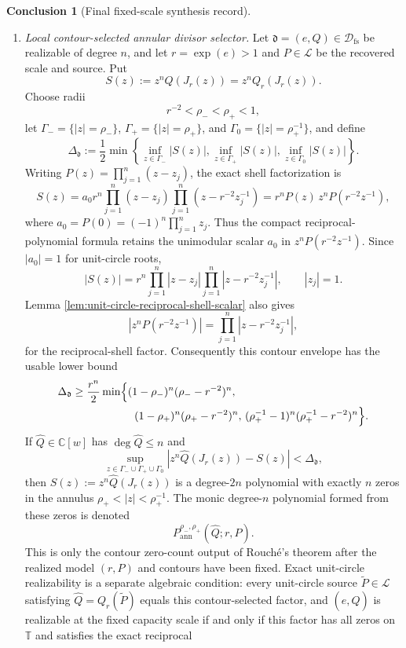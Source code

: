 \documentclass[12pt,a4paper]{article}
\theoremstyle{plain}
\theoremstyle{definition}
\newtheorem{conclusion}[theorem]{Conclusion}
\numberwithin{equation}{section}
\newcommand{\CC}{\mathbb{C}}
\newcommand{\TT}{\mathbb{T}}
\begin{document}
\begin{conclusion}[Final fixed-scale synthesis record]
\begin{enumerate}[label=\textup{(\alph*)},leftmargin=*]
\item \emph{Local contour-selected annular divisor selector.}
Let \(\mathfrak d=(e,Q)\in\mathcal D_{\mathrm{fs}}\) be realizable of degree \(n\), and
let \(r=\exp(e)>1\) and \(P\in\mathcal L\) be the recovered scale and
source.  Put
\[
S(z):=z^nQ(J_r(z))=z^nQ_r(J_r(z)).
\]
Choose radii
\[
r^{-2}<\rho_-<\rho_+<1,
\]
let \(\Gamma_-=\{|z|=\rho_-\}\), \(\Gamma_+=\{|z|=\rho_+\}\), and \(\Gamma_0=\{|z|=\rho_+^{-1}\}\), and define
\[
\Delta_{\mathfrak d}:=\frac12\min\left\{
\inf_{z\in\Gamma_-}|S(z)|,
\inf_{z\in\Gamma_+}|S(z)|,
\inf_{z\in\Gamma_0}|S(z)|
\right\}.
\]
Writing \(P(z)=\prod_{j=1}^{n}(z-z_j)\), the exact shell factorization is
\[
S(z)
=a_0r^n\prod_{j=1}^{n}(z-z_j)
\prod_{j=1}^{n}(z-r^{-2}z_j^{-1})
=r^nP(z)\,z^nP(r^{-2}z^{-1}),
\]
where \(a_0=P(0)=(-1)^n\prod_{j=1}^{n}z_j\).  Thus the compact
reciprocal-polynomial formula retains the unimodular scalar \(a_0\) in
\(z^nP(r^{-2}z^{-1})\).  Since \(|a_0|=1\) for unit-circle roots,
\[
|S(z)|=r^n\prod_{j=1}^{n}|z-z_j|
\prod_{j=1}^{n}|z-r^{-2}z_j^{-1}|,
\qquad |z_j|=1.
\]
Lemma \ref{lem:unit-circle-reciprocal-shell-scalar} also gives
\[
\left|z^nP(r^{-2}z^{-1})\right|
=\prod_{j=1}^{n}|z-r^{-2}z_j^{-1}|,
\]
for the reciprocal-shell factor.  Consequently this contour envelope has
the usable lower bound
\[
\begin{aligned}
\Delta_{\mathfrak d}
&\ge
\frac{r^n}{2}\min\Bigl\{
(1-\rho_-)^n(\rho_- - r^{-2})^n,\\
&\hspace{5.7em}
(1-\rho_+)^n(\rho_+ - r^{-2})^n,\,
(\rho_+^{-1}-1)^n(\rho_+^{-1}-r^{-2})^n
\Bigr\}.
\end{aligned}
\]
If \(\widehat Q\in\CC[w]\) has \(\deg\widehat Q\le n\) and
\[
\sup_{z\in\Gamma_-\cup\Gamma_+\cup\Gamma_0}
\left|z^n\widehat Q(J_r(z))-S(z)\right|<\Delta_{\mathfrak d},
\]
then \(\widehat S(z):=z^n\widehat Q(J_r(z))\) is a degree-\(2n\)
polynomial with exactly \(n\) zeros in the annulus
\(\rho_+<|z|<\rho_+^{-1}\).  The monic degree-\(n\) polynomial formed
from these zeros is denoted
\[
P_{\mathrm{ann}}^{\rho_-,\rho_+}(\widehat Q;r,P).
\]
This is only the contour zero-count output of Rouch\'e's theorem after the
realized model \((r,P)\) and contours have been fixed.  Exact
unit-circle realizability is a separate algebraic condition: every
unit-circle source \(\widetilde P\in\mathcal L\) satisfying
\(\widehat Q=Q_r(\widetilde P)\) equals this contour-selected factor, and
\((e,\widehat Q)\) is realizable at the fixed capacity scale if and only
if this factor has all zeros on \(\TT\) and satisfies the exact reciprocal

\end{enumerate}
\end{conclusion}
\end{document}
